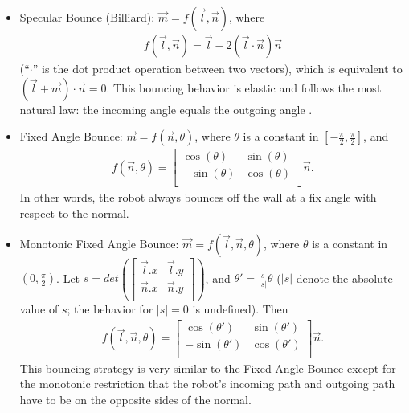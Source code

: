 \documentclass[letterpaper, 10 pt, conference]{ieeeconf}  %
\begin{document}
\begin{itemize}
    \item Specular Bounce (Billiard): $\vec{m} = f(\vec{l}, \vec{n})$, where \begin{eqnarray*}
    f(\vec{l}, \vec{n}) = \vec{l} - 2(\vec{l}\cdot \vec{n})\vec{n}
    \end{eqnarray*}
    (``$\cdot$'' is the dot product operation between two vectors), which is equivalent to $(\vec{l}+\vec{m}) \cdot \vec{n} = 0$. This bouncing behavior is elastic and follows the most natural law: the incoming angle equals the outgoing angle \cite{geometry_billards}.
    \item Fixed Angle Bounce: $\vec{m} = f(\vec{n}, \theta)$, where $\theta$ is a constant in $[-\frac{\pi}{2}, \frac{\pi}{2}]$, and \begin{eqnarray*}f(\vec{n}, \theta) = 
    \begin{bmatrix} 
    \cos(\theta) & \sin(\theta)\\
    -\sin(\theta) & \cos(\theta)\\
    \end{bmatrix}\vec{n}.\end{eqnarray*} In other words, the robot always bounces off the wall at a fix angle with respect to the normal.
    \item Monotonic Fixed Angle Bounce: $\vec{m} = f(\vec{l}, \vec{n}, \theta)$, where $\theta$ is a constant in $(0, \frac{\pi}{2})$. Let $s = det(\begin{bmatrix} 
    \vec{l}.x & \vec{l}.y\\
    \vec{n}.x & \vec{n}.y\\
    \end{bmatrix})$, and $\theta' = \frac{s}{|s|}\theta$ ($|s|$ denote the absolute value of $s$; the behavior for $|s| = 0$ is undefined). Then \begin{eqnarray*}f(\vec{l}, \vec{n}, \theta) = 
    \begin{bmatrix} 
    \cos(\theta') & \sin(\theta')\\
    -\sin(\theta') & \cos(\theta')\\
    \end{bmatrix}\vec{n}.\end{eqnarray*} This bouncing strategy is very similar to the Fixed Angle Bounce except for the monotonic restriction that the robot's incoming path and outgoing path have to be on the opposite sides of the normal.
    

\end{itemize}
\end{document}
